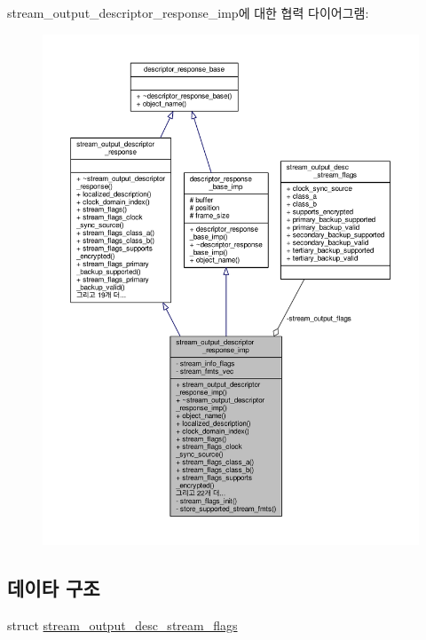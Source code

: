stream\+\_\+output\+\_\+descriptor\+\_\+response\+\_\+imp에 대한 협력 다이어그램\+:
\nopagebreak
\begin{figure}[H]
\begin{center}
\leavevmode
\includegraphics[width=350pt]{classavdecc__lib_1_1stream__output__descriptor__response__imp__coll__graph}
\end{center}
\end{figure}
\subsection*{데이타 구조}
\begin{DoxyCompactItemize}
\item 
struct \hyperlink{structavdecc__lib_1_1stream__output__descriptor__response__imp_1_1stream__output__desc__stream__flags}{stream\+\_\+output\+\_\+desc\+\_\+stream\+\_\+flags}
\end{DoxyCompactItemize}

